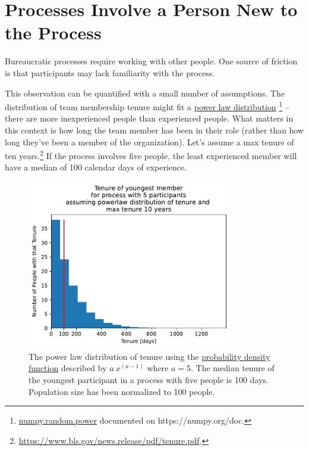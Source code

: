 \section{Processes Involve a Person New to the Process}



Bureaucratic processes require working with other people. One source of friction is that participants may lack familiarity with the process. 

This observation can be quantified with a small number of assumptions. The distribution of team membership tenure might fit a \href{https://en.wikipedia.org/wiki/Power_law}{power law distribution}
\footnote{\href{https://numpy.org/doc/stable/reference/random/generated/numpy.random.power.html}{numpy.random.power} documented on https://numpy.org/doc.}
-- there are more inexperienced people than experienced people. What matters in this context is how long the team member has been in their role (rather than how long they've been a member of the organization). Let's assume a max tenure of ten years.\footnote{\href{https://www.bls.gov/news.release/pdf/tenure.pdf}{https://www.bls.gov/news.release/pdf/tenure.pdf}.} If the process involves five people, the least experienced member will have a median of 100 calendar days of experience.

\begin{figure}[!htb] %
    \centering
    \includegraphics[width=0.8\textwidth]{images/tenure_power_distribution_a5_with_max_tenure10_and_5_participants.pdf}
    \caption{The power law distribution of tenure using the \href{https://en.wikipedia.org/wiki/Probability_density_function}{probability density function}
    described by $a\ x^{(a-1)}$ where $a=5$. The median tenure of the youngest participant  in a process with five people is 100 days. Population size has been normalized to 100 people.}
    \label{fig:tenure-powerlaw-5-participants-tenure10}
\end{figure}


